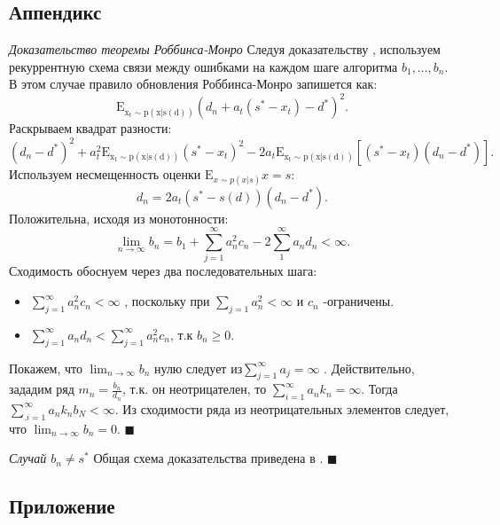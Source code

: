 \documentclass{mipt-thesis-bs}
\begin{document}
\subsection{Аппендикс}
\textit{Доказательство теоремы Роббинса-Монро} \label{monro}
Следуя доказательству \cite{blum1954approximation}, используем рекуррентную схема связи между ошибками на каждом шаге алгоритма $b_1,\dots,b_n$. 
В этом случае правило обновления Роббинса-Монро запишется как: 
\begin{equation}
    \mathrm{E_{x_t \sim p(x|s(d))}}(d_n+a_t(s^*-x_t) -d^*)^2.
\end{equation}
Раскрываем квадрат разности:
\begin{equation}
    (d_n - d^*)^2 + a_t^2 \mathrm{E_{x_t \sim p(x|s(d))}} (s^*-x_t)^2 - 2 a_t \mathrm{E_{x_t \sim p(x|s(d))}}\left[ (s^*-x_t)(d_n-d^*) \right].
\end{equation}
Используем несмещенность оценки $\mathrm{E}_{x \sim p(x|s)} x = s$:
\begin{equation}
    d_n =2 a_t (s^* -s(d))(d_n-d^*).
\end{equation}
Положительна, исходя из монотонности:
\begin{equation}
    \lim_{n \rightarrow \infty} b_n = b_1 + \sum_{j=1}^\infty a_n^2 c_n -2 \sum_1^{\infty} a_n d_n < \infty.
\end{equation}
Сходимость обоснуем через два последовательных шага: \begin{itemize}
    \item  $\sum_{j=1}^\infty a_n^2 c_n < \infty$ , поскольку при $\sum_{j=1} a_n^2 < \infty $ и $c_n$ -ограничены.
    \item $\sum_{j=1}^\infty a_n d_n < \sum_{j=1}^\infty a_n^2 c_n$,  т.к $b_n \ge 0$.
\end{itemize}
Покажем, что $\lim_{n \rightarrow \infty}{b_n}$  нулю следует из$\sum_{j=1}^\infty a_j  =\infty$ .
Действительно, зададим ряд $m_n = \frac{b_n}{d_n}$, т.к. он неотрицателен, то $\sum_{i=1}^{\infty} a_n k_n = \infty $. 
Тогда $\sum_{.i=1}^{\infty} a_n k_n b_N < \infty $. 
Из сходимости ряда из неотрицательных элементов следует, что $\lim_{n \rightarrow \infty}b_n =0$.
$\blacksquare$

\textit{Случай $b_n \ne s^*$} \label{ino}
Общая схема доказательства приведена в \cite{lai1979adaptive}.
$\blacksquare$

\printbibliography


\pagebreak

\subsection{Приложение}
\end{document}
